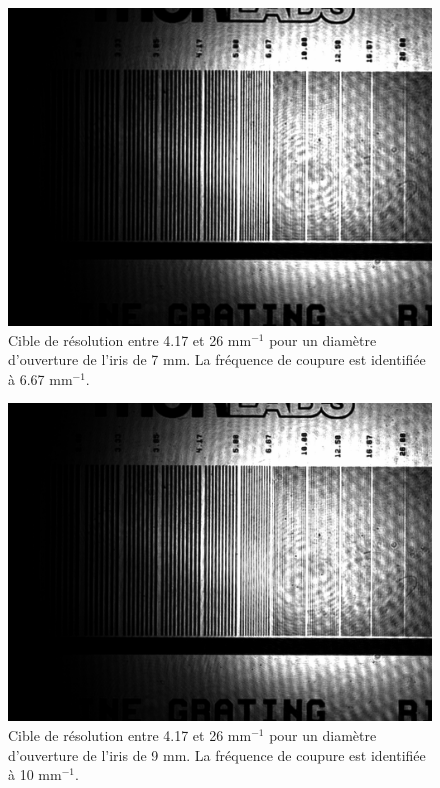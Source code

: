 \documentclass[11pt,letterpaper]{article}
\begin{document}
\begin{figure}[H]
  \centering
  \includegraphics[scale=0.28]{cible_d7_8-14.png}
  \caption{Cible de résolution entre 4.17 et 26 mm$^{-1}$ pour un diamètre d'ouverture de l'iris de 7 mm. La fréquence de coupure est identifiée à 6.67 mm$^{-1}$.}
  \label{cible7}
\end{figure}

\begin{figure}[H]
  \centering
  \includegraphics[scale=0.28]{cible_d9_8-14.png}
  \caption{Cible de résolution entre 4.17 et 26 mm$^{-1}$ pour un diamètre d'ouverture de l'iris de 9 mm. La fréquence de coupure est identifiée à 10 mm$^{-1}$.}
  \label{cible9}
\end{figure}
\end{document}
